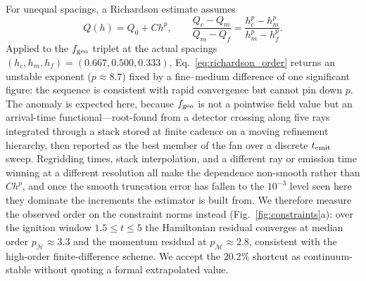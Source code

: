 \documentclass[twocolumn,floatfix,aps,prd,nofootinbib]{revtex4-2}
\begin{document}
For unequal spacings, a Richardson estimate assumes
\begin{equation}
 Q(h)=Q_0+Ch^p,\qquad
 \frac{Q_c-Q_m}{Q_m-Q_f}
 =\frac{h_c^p-h_m^p}{h_m^p-h_f^p}.
 \label{eq:richardson_order}
\end{equation}
Applied to the $f_{\rm geo}$ triplet at the actual spacings
$(h_c,h_m,h_f)=(0.667,0.500,0.333)$, Eq.~\eqref{eq:richardson_order} returns an
unstable exponent ($p\approx8.7$) fixed by a fine--medium difference of one
significant figure: the sequence is consistent with rapid convergence but
cannot pin down $p$. The anomaly is expected here, because $f_{\rm geo}$ is not
a pointwise field value but an arrival-time functional---root-found from a
detector crossing along five rays integrated through a stack stored at finite
cadence on a moving refinement hierarchy, then reported as the best member of
the fan over a discrete $t_{\rm emit}$ sweep. Regridding times, stack
interpolation, and a different ray or emission time winning at a different
resolution all make the dependence non-smooth rather than $Ch^p$, and once the
smooth truncation error has fallen to the $10^{-3}$ level seen here they
dominate the increments the estimator is built from. We therefore measure the
observed order on the constraint norms instead
(Fig.~\ref{fig:constraints}a): over the ignition window $1.5\le t\le5$ the
Hamiltonian residual converges at median order $p_{\mathcal H}\approx3.3$ and
the momentum residual at $p_{\mathcal M}\approx2.8$, consistent with the
high-order finite-difference scheme. We accept the $20.2\%$ shortcut as
continuum-stable without quoting a formal extrapolated value.
\end{document}
